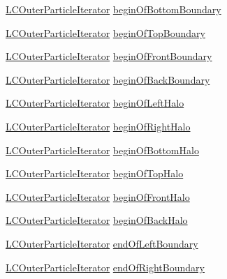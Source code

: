 \begin{DoxyCompactItemize}
\hyperlink{classutils_1_1LCOuterParticleIterator}{L\-C\-Outer\-Particle\-Iterator} \hyperlink{classutils_1_1LCParticleContainer_ac93b3e1a838df7d83632505c98762490}{begin\-Of\-Bottom\-Boundary}
\item 
\hyperlink{classutils_1_1LCOuterParticleIterator}{L\-C\-Outer\-Particle\-Iterator} \hyperlink{classutils_1_1LCParticleContainer_a8a597b99eedeecacce4e5a087c942d55}{begin\-Of\-Top\-Boundary}
\item 
\hyperlink{classutils_1_1LCOuterParticleIterator}{L\-C\-Outer\-Particle\-Iterator} \hyperlink{classutils_1_1LCParticleContainer_a7d0831bee8c4edd058773b42c8912aac}{begin\-Of\-Front\-Boundary}
\item 
\hyperlink{classutils_1_1LCOuterParticleIterator}{L\-C\-Outer\-Particle\-Iterator} \hyperlink{classutils_1_1LCParticleContainer_ae6b2f4b3b425de35c0008170717c0106}{begin\-Of\-Back\-Boundary}
\item 
\hyperlink{classutils_1_1LCOuterParticleIterator}{L\-C\-Outer\-Particle\-Iterator} \hyperlink{classutils_1_1LCParticleContainer_a7883c250b606f1d1189fd9d3c20d98b0}{begin\-Of\-Left\-Halo}
\item 
\hyperlink{classutils_1_1LCOuterParticleIterator}{L\-C\-Outer\-Particle\-Iterator} \hyperlink{classutils_1_1LCParticleContainer_ac7b8beaf3c7c6db2928f7efc8a2355b3}{begin\-Of\-Right\-Halo}
\item 
\hyperlink{classutils_1_1LCOuterParticleIterator}{L\-C\-Outer\-Particle\-Iterator} \hyperlink{classutils_1_1LCParticleContainer_ad1a972864a0b4a7d7e80fef6cb40bfcf}{begin\-Of\-Bottom\-Halo}
\item 
\hyperlink{classutils_1_1LCOuterParticleIterator}{L\-C\-Outer\-Particle\-Iterator} \hyperlink{classutils_1_1LCParticleContainer_a0647df4a480715cf6cdd95f400114a3e}{begin\-Of\-Top\-Halo}
\item 
\hyperlink{classutils_1_1LCOuterParticleIterator}{L\-C\-Outer\-Particle\-Iterator} \hyperlink{classutils_1_1LCParticleContainer_ac9f32db592c1aefdc11ec9ceaaa7810e}{begin\-Of\-Front\-Halo}
\item 
\hyperlink{classutils_1_1LCOuterParticleIterator}{L\-C\-Outer\-Particle\-Iterator} \hyperlink{classutils_1_1LCParticleContainer_ad4ea11d0c0bc9a1013d51e403299c0e4}{begin\-Of\-Back\-Halo}
\item 
\hyperlink{classutils_1_1LCOuterParticleIterator}{L\-C\-Outer\-Particle\-Iterator} \hyperlink{classutils_1_1LCParticleContainer_a3d2942e316e92997c4b4eac72dcf4605}{end\-Of\-Left\-Boundary}
\item 
\hyperlink{classutils_1_1LCOuterParticleIterator}{L\-C\-Outer\-Particle\-Iterator} \hyperlink{classutils_1_1LCParticleContainer_ae069cdc78719a350f2174f3f5d461144}{end\-Of\-Right\-Boundary}

\end{DoxyCompactItemize}
